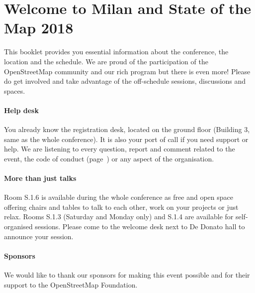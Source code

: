 \newpage
\section*{Welcome to Milan and State of the Map 2018} \label{welcome}
This booklet provides you essential information
about the conference, the location and the schedule.  We are proud of the participation of the
OpenStreetMap community and our rich program but there is even more!  Please do get involved and
take advantage of the off-schedule sessions, discussions and spaces.

\paragraph*{Help desk} \label{welcome-helpdesk}
You already know the registration desk, located on the ground floor (Building 3, same as the whole
conference). It is also your port of call if you need support or help. We are listening to every
question, report and comment related to the event, the code of conduct (page~\pageref{coc}) or any
aspect of the organisation.

\paragraph*{More than just talks} \label{welcome-location}
Room S.1.6 is available during the whole conference as free and open space offering chairs and tables
to talk to each other, work on your projects or just relax. Rooms S.1.3 (Saturday and Monday only) and S.1.4 are available for
self-organised sessions.  Please come to the welcome desk next to De Donato hall to announce your session.

\paragraph*{Sponsors} \label{welcome-sponsors}
We would like to thank our sponsors for making this event possible and for their support to the
OpenStreetMap Foundation.
\newpage
